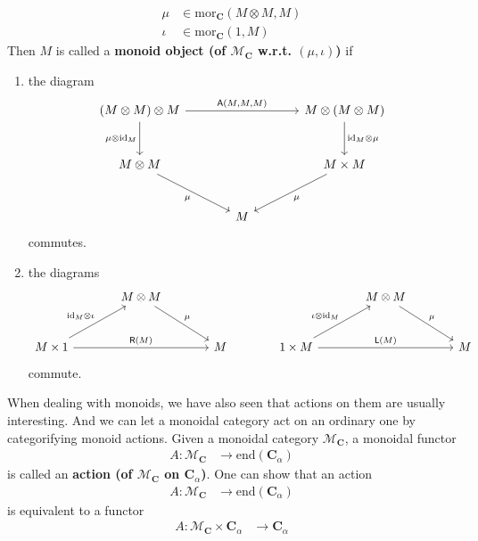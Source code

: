 \begin{align*}
  \mu
  &\in
  \mathrm{mor}_{\mathbf{C}}
  \left(
    M
    \otimes
    M,
    M
  \right)
  \\
  \iota
  &\in
  \mathrm{mor}_{\mathbf{C}}
  \left(
    1,
    M
  \right)
\end{align*}
Then $M$ is called a \textbf{monoid object (of $\mathcal{M}_{\mathbf{C}}$ w.r.t. $(\mu,\iota)$)} if
\begin{enumerate}
\item[(MO1)]
the diagram
\[
\begin{tikzcd}[sep=large]
  (M \otimes M)
  \otimes
  M
  \arrow{rr}{\mathsf{A}(M,M,M)}
  \arrow[swap]{d}{\mu \otimes \mathrm{id}_{M}}
  &
  &
  M
  \otimes
  (M \otimes M)
  \arrow{d}{\mathrm{id}_{M} \otimes \mu}
  \\
  M
  \otimes
  M
  \arrow[swap]{dr}{\mu}
  &
  &
  M
  \times
  \arrow{dl}{\mu}
  M
  \\
  &
  M
  &
\end{tikzcd}
\]
commutes.
\item[(MO2)]
the diagrams
\[
\begin{tikzcd}[sep=large]
  &
  M
  \otimes
  M
  \arrow{dr}{\mu}
  &
  &
  &
  M
  \otimes
  M
  \arrow{dr}{\mu}
  &
  \\
  M
  \times
  1
  \arrow{ur}{\mathrm{id}_{M} \otimes \iota}
  \arrow{rr}{\mathsf{R}(M)}
  &
  &
  M
  &
  1
  \times
  M
  \arrow{ur}{\iota \otimes \mathrm{id}_{M}}
  \arrow{rr}{\mathsf{L}(M)}
  &
  &
  M
\end{tikzcd}
\]
commute.
\end{enumerate}
When dealing with monoids, we have also seen that actions on them are usually interesting.
And we can let a monoidal category act on an ordinary one by categorifying monoid actions.
Given a monoidal category $\mathcal{M}_{\mathbf{C}}$, a monoidal functor
\begin{align*}
  A
  \colon
  \mathcal{M}_{\mathbf{C}}
  &\rightarrow
  \mathrm{end}(\mathbf{C}_{\alpha})
\end{align*}
is called an \textbf{action (of $\mathcal{M}_{\mathbf{C}}$ on $\mathbf{C}_{\alpha}$)}.
One can show that an action
\begin{align*}
  A
  \colon
  \mathcal{M}_{\mathbf{C}}
  &\rightarrow
  \mathrm{end}(\mathbf{C}_{\alpha})
\end{align*}
is equivalent to a functor
\begin{align*}
  A
  \colon
  \mathcal{M}_{\mathbf{C}}
  \times
  \mathbf{C}_{\alpha}
  &\rightarrow
  \mathbf{C}_{\alpha}
\end{align*}
